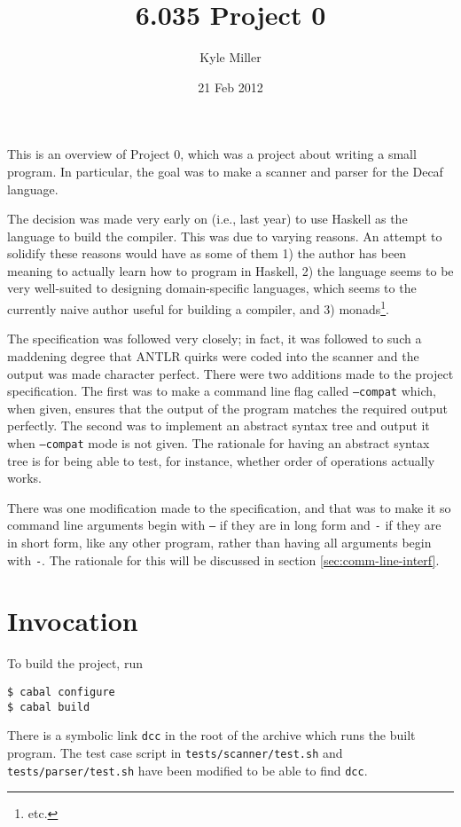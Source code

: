 \documentclass[11pt]{article}
\title{6.035 Project 0}
\author{Kyle Miller}
\date{21 Feb 2012}
\begin{document}
\maketitle

This is an overview of Project 0, which was a project about writing a
small program.  In particular, the goal was to make a scanner and
parser for the Decaf language.

The decision was made very early on (i.e., last year) to use Haskell
as the language to build the compiler.  This was due to varying
reasons.  An attempt to solidify these reasons would have as some of
them 1) the author has been meaning to actually learn how to program
in Haskell, 2) the language seems to be very well-suited to designing
domain-specific languages, which seems to the currently naive author
useful for building a compiler, and 3) monads\footnote{etc.}.

The specification was followed very closely; in fact, it was followed
to such a maddening degree that ANTLR quirks were coded into the
scanner and the output was made character perfect.  There were two
additions made to the project specification.  The first was to make a
command line flag called \texttt{--compat} which, when given, ensures
that the output of the program matches the required output perfectly.
The second was to implement an abstract syntax tree and output it when
\texttt{--compat} mode is not given.  The rationale for having an
abstract syntax tree is for being able to test, for instance, whether
order of operations actually works.

There was one modification made to the specification, and that was to
make it so command line arguments begin with \texttt{--} if they are
in long form and \texttt{-} if they are in short form, like any other
program, rather than having all arguments begin with \texttt{-}.  The
rationale for this will be discussed in section
\ref{sec:comm-line-interf}.

\section{Invocation}
\label{sec:invocation}

To build the project, run
\begin{verbatim}
$ cabal configure
$ cabal build
\end{verbatim}
There is a symbolic link \texttt{dcc} in the root of the archive which
runs the built program.  The test case script in
\texttt{tests/scanner/test.sh} and \texttt{tests/parser/test.sh} have
been modified to be able to find \texttt{dcc}.
\end{document}
